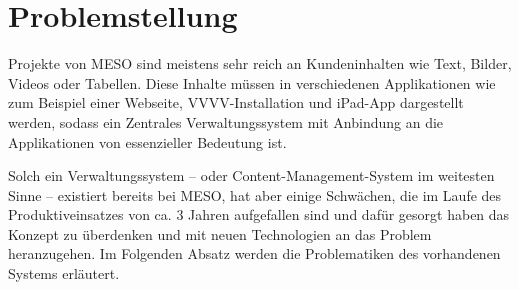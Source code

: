 \section{Problemstellung}
\label{sec:e-problemstellung}

Projekte von MESO sind meistens sehr reich an Kundeninhalten wie Text, Bilder,
Videos oder Tabellen.  Diese Inhalte müssen in verschiedenen Applikationen wie
zum Beispiel einer Webseite, VVVV-Installation und iPad-App dargestellt werden,
sodass ein Zentrales Verwaltungssystem mit Anbindung an die Applikationen von
essenzieller Bedeutung ist.

Solch ein Verwaltungssystem -- oder Content-Management-System im weitesten
Sinne -- existiert bereits bei MESO, hat aber einige Schwächen, die im Laufe
des Produktiveinsatzes von ca. 3 Jahren aufgefallen sind und dafür gesorgt
haben das Konzept zu überdenken und mit neuen Technologien an das Problem
heranzugehen.  Im Folgenden Absatz werden die Problematiken des vorhandenen
Systems erläutert.


